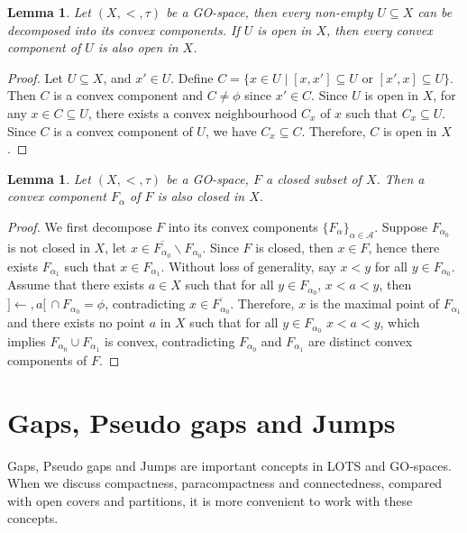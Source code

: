 \documentclass[12pt,oneside,english]{amsbook}
\numberwithin{equation}{section} %
\numberwithin{figure}{section} %
\theoremstyle{plain}
\numberwithin{section}{chapter}
\theoremstyle{plain}
\newtheorem{lem}[thm]{Lemma}
\begin{document}
\begin{lem}
  Let $(X,<,\tau)$ be a GO-space, then every non-empty $U \subseteq X$ can be decomposed into its convex components. If $U$ is open in $X$, then every convex component of $U$ is also open in $X$.
\end{lem}
\begin{proof}
  Let  $U \subseteq X$, and $x' \in U$. Define $C = \{x \in U \; | \; [x,x'] \subseteq U $ or $[x',x] \subseteq U \}$. Then $C$ is a convex component and $C \neq \phi$ since $x' \in C$. Since $U$ is open in $X$, for any $x \in C \subseteq U$, there exists a convex neighbourhood $C_x$ of $x$ such that $C_x \subseteq U$. Since $C$ is a convex component of $U$, we have $C_x \subseteq C$. Therefore, $C$ is open in $X$.
\end{proof}

\begin{lem}
  Let $(X,<,\tau)$ be a GO-space, $F$ a closed subset of $X$. Then a convex component $F_{\alpha}$ of $F$ is also closed in $X$.
\end{lem}
\begin{proof}
  We first decompose $F$ into its convex components $\{F_{\alpha}\}_{\alpha \in \mathcal{A}}$. Suppose $F_{\alpha_{0}}$ is not closed in $X$, let $x \in \overline{F_{\alpha_{0}}} \backslash F_{\alpha_0}$. Since $F$ is closed, then $x \in F$, hence there exists $F_{\alpha_{1}}$ such that $x \in F_{\alpha_{1}}$. Without loss of generality, say $x < y$ for all $y \in F_{\alpha_{0}}$. Assume that there exists $a \in X$ such that for all $y \in F_{\alpha_{0}}$, $x < a < y$, then $] \leftarrow, a[ \, \cap F_{\alpha_{0}} = \phi$, contradicting $x \in \overline{F_{\alpha_{0}}}$. Therefore, $x$ is the maximal point of $F_{\alpha_{1}}$ and there exists no point $a$ in $X$ such that for all $y \in F_{\alpha_{0}}$ $x < a < y$, which implies $F_{\alpha_{0}} \cup F_{\alpha_{1}}$ is convex, contradicting $F_{\alpha_{0}}$ and $F_{\alpha_{1}}$ are distinct convex components of $F$.
\end{proof}

\section{Gaps, Pseudo gaps and Jumps}
Gaps, Pseudo gaps and Jumps are important concepts in LOTS and GO-spaces. When we discuss compactness, paracompactness and connectedness, compared with open covers and partitions, it is more convenient to work with these concepts.
\end{document}
